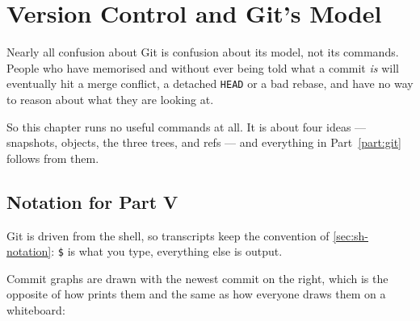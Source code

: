\chapter{Version Control and Git's Model}\label{ch:git-model}

Nearly all confusion about Git is confusion about its model, not its commands.
People who have memorised  and  without ever being
told what a commit \emph{is} will eventually hit a merge conflict, a detached
\texttt{HEAD} or a bad rebase, and have no way to reason about what they are
looking at.

So this chapter runs no useful commands at all. It is about four ideas ---
snapshots, objects, the three trees, and refs --- and everything in
Part~\ref{part:git} follows from them.

\section{Notation for Part V}\label{sec:git-notation}

Git is driven from the shell, so transcripts keep the convention of
\autoref{sec:sh-notation}: \texttt{\$} is what you type, everything else is
output.


Commit graphs are drawn with the newest commit on the right, which is the
opposite of how  prints them and the same as how everyone draws
them on a whiteboard:

\begin{center}
\end{center}

